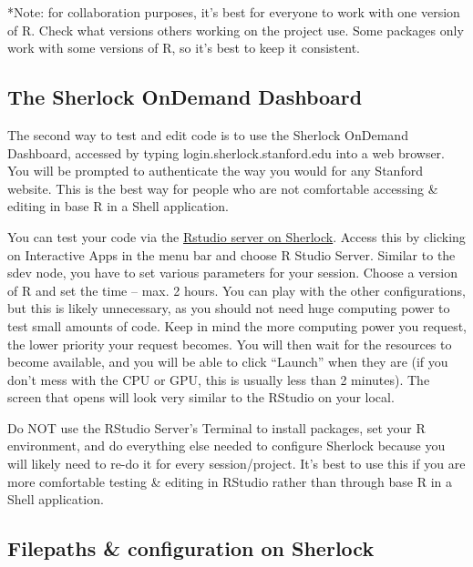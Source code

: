 \documentclass[
]{book}
\begin{document}
*Note: for collaboration purposes, it's best for everyone to work with one version of R. Check what versions others working on the project use. Some packages only work with some versions of R, so it's best to keep it consistent.

\hypertarget{the-sherlock-ondemand-dashboard}{%
\subsection{The Sherlock OnDemand Dashboard}\label{the-sherlock-ondemand-dashboard}}

The second way to test and edit code is to use the Sherlock OnDemand Dashboard, accessed by typing login.sherlock.stanford.edu into a web browser. You will be prompted to authenticate the way you would for any Stanford website. This is the best way for people who are not comfortable accessing \& editing in base R in a Shell application.

You can test your code via the \href{https://www.sherlock.stanford.edu/docs/user-guide/ondemand/\#rstudio}{Rstudio server on Sherlock}. Access this by clicking on Interactive Apps in the menu bar and choose R Studio Server. Similar to the sdev node, you have to set various parameters for your session. Choose a version of R and set the time -- max. 2 hours. You can play with the other configurations, but this is likely unnecessary, as you should not need huge computing power to test small amounts of code. Keep in mind the more computing power you request, the lower priority your request becomes. You will then wait for the resources to become available, and you will be able to click ``Launch'' when they are (if you don't mess with the CPU or GPU, this is usually less than 2 minutes). The screen that opens will look very similar to the RStudio on your local.

Do NOT use the RStudio Server's Terminal to install packages, set your R environment, and do everything else needed to configure Sherlock because you will likely need to re-do it for every session/project. It's best to use this if you are more comfortable testing \& editing in RStudio rather than through base R in a Shell application.

\hypertarget{filepaths-configuration-on-sherlock}{%
\subsection{Filepaths \& configuration on Sherlock}\label{filepaths-configuration-on-sherlock}}
\end{document}

